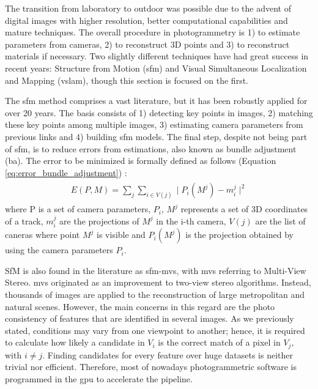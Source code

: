 The transition from laboratory to outdoor was possible due to the advent of digital images with higher resolution, better computational capabilities and mature techniques. The overall procedure in photogrammetry is 1) to estimate parameters from cameras, 2) to reconstruct 3D points and 3) to reconstruct materials if necessary. Two slightly different techniques have had great success in recent years: Structure from Motion (\acrshort{sfm}) and Visual Simultaneous Localization and Mapping (\acrshort{vslam}), though this section is focused on the first. 

The \acrshort{sfm} method comprises a vast literature, but it has been robustly applied for over 20 years. The basis consists of 1) detecting key points in images, 2) matching these key points among multiple images, 3) estimating camera parameters from previous links and 4) building \acrshort{sfm} models. The final step, despite not being part of \acrshort{sfm}, is to reduce errors from estimations, also known as bundle adjustment (\acrshort{ba}). The error to be minimized is formally defined as follows (Equation \ref{eq:error_bundle_adjustment}) \cite{furukawa_multi-view_2015}:
\begin{gather}
    \label{eq:error_bundle_adjustment}
    \begin{aligned}
        E(P, M) = \sum_{j} \sum_{i \in V(j)} \mid P_i(M^j) - m_{i}^{j} \mid^2
    \end{aligned}
\end{gather}
where P is a set of camera parameters, ${P_i}$, $M^j$ represents a set of 3D coordinates of a track, $m_{i}^{j}$ are the projections of $M^j$ in the i-th camera, $V(j)$ are the list of caneras where point $M^j$ is visible and $P_i(M^j)$ is the projection obtained by using the camera parameters $P_i$.

SfM is also found in the literature as \acrshort{sfm}-\acrshort{mvs}, with \acrshort{mvs} referring to Multi-View Stereo. \acrshort{mvs} originated as an improvement to two-view stereo algorithms. Instead, thousands of images are applied to the reconstruction of large metropolitan and natural scenes. However, the main concerns in this regard are the photo consistency of features that are identified in several images. As we previously stated, conditions may vary from one viewpoint to another; hence, it is required to calculate how likely a candidate in $V_i$ is the correct match of a pixel in $V_j$, with $i \neq j$. Finding candidates for every feature over huge datasets is neither trivial nor efficient. Therefore, most of nowadays photogrammetric software is programmed in the \acrshort{gpu} to accelerate the pipeline.

